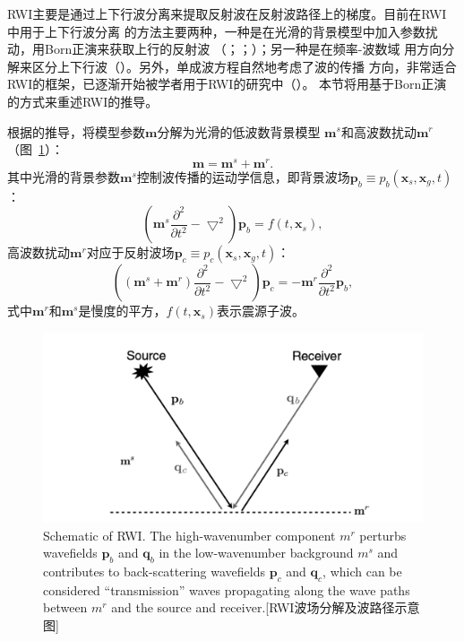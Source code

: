 RWI主要是通过上下行波分离来提取反射波在反射波路径上的梯度。目前在RWI中用于上下行波分离
的方法主要两种，一种是在光滑的背景模型中加入参数扰动，用Born正演来获取上行的反射波
（；；）；另一种是在频率-波数域
用方向分解来区分上下行波（）。另外，单成波方程自然地考虑了波的传播
方向，非常适合RWI的框架，已逐渐开始被学者用于RWI的研究中（）。
本节将用基于Born正演的方式来重述RWI的推导。

根据的推导，将模型参数$\mathbf{m}$分解为光滑的低波数背景模型
$\mathbf{m}^s$和高波数扰动$\mathbf{m}^r$（图~\ref{fig:schematic_rwi}）：
\begin{equation}
	\mathbf{m}=\mathbf{m}^s+\mathbf{m}^r.
\end{equation}
其中光滑的背景参数$\mathbf{m}^s$控制波传播的运动学信息，即背景波场$\mathbf{p}_b
\equiv p_b(\mathbf{x}_s,\mathbf{x}_g,t)$：
\begin{equation}
	\left(\mathbf{m}^s\frac{\partial^2}{\partial t^2}-\bigtriangledown^2\right)\mathbf{p}_b
	=f(t,\mathbf{x}_s),
\end{equation}
高波数扰动$\mathbf{m}^r$对应于反射波场$\mathbf{p}_c\equiv p_c(\mathbf{x}_s,\mathbf{x}_g,t)$：
\begin{equation}
	\left((\mathbf{m}^s+\mathbf{m}^r)\frac{\partial^2}{\partial t^2}-\bigtriangledown^2\right)
	\mathbf{p}_c=-\mathbf{m}^r\frac{\partial^2}{\partial t^2}\mathbf{p}_b,
\end{equation}
式中$\mathbf{m}^r$和$\mathbf{m}^s$是慢度的平方，$f(t,\mathbf{x}_s)$表示震源子波。

\begin{figure}[!htbp]
	\centering
	\includegraphics[width=0.7\linewidth]{figure/schematic_rwi}
	{Schematic of RWI. The high-wavenumber component
	$m^r$ perturbs wavefields $\mathbf{p}_b$ and $\mathbf{q}_b$ in the
	low-wavenumber background $m^s$ and contributes to back-scattering
	wavefields $\mathbf{p}_c$ and $\mathbf{q}_c$, which can be considered
	“transmission” waves propagating along the wave paths between $m^r$ and
	the source and receiver.}[RWI波场分解及波路径示意图]
	\label{fig:schematic_rwi}
\end{figure}

